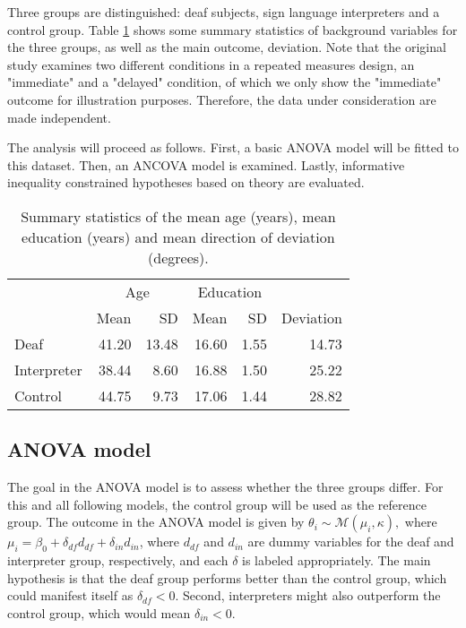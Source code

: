 \documentclass[11pt,a4paper]{article}\usepackage[]{graphicx}\usepackage[]{color}
\begin{document}
Three groups are distinguished: deaf subjects, sign language interpreters and a control group. Table \ref{ExampleDescrTable} shows some summary statistics of background variables for the three groups, as well as the main outcome, deviation. Note that the original study examines two different conditions in a repeated measures design, an "immediate" and a "delayed" condition, of which we only show the "immediate" outcome for illustration purposes. Therefore, the data under consideration are made independent.

The analysis will proceed as follows. First, a basic ANOVA model will be fitted to this dataset. Then, an ANCOVA model is examined. Lastly, informative inequality constrained hypotheses based on theory are evaluated.

\begin{table}[btp]
\centering
\caption{Summary statistics of the mean age (years), mean education (years) and mean direction of deviation (degrees).} 
\label{ExampleDescrTable}
\begin{tabular}{lrrrrr}
  \toprule & \multicolumn{2}{c}{Age} & \multicolumn{2}{c}{Education} &  \\  \cmidrule(lr){2-3} \cmidrule(lr){4-5}  & Mean & SD & Mean & SD & Deviation \\ 
  \midrule
Deaf & 41.20 & 13.48 & 16.60 & 1.55 & 14.73 \\ 
  Interpreter & 38.44 & 8.60 & 16.88 & 1.50 & 25.22 \\ 
  Control & 44.75 & 9.73 & 17.06 & 1.44 & 28.82 \\ 
   \bottomrule
\end{tabular}
\end{table}



\subsection{ANOVA model}



The goal in the ANOVA model is to assess whether the three groups differ. For this and all following models, the control group will be used as the reference group. The outcome in the ANOVA model is given by \( \theta_i \sim \mathcal{M}(\mu_i, \kappa), \) where \( \mu_i = \beta_0 + \delta_{df} d_{df} + \delta_{in} d_{in}\), where \( d_{df} \) and \( d_{in} \) are dummy variables for the deaf and interpreter group, respectively, and each \( \delta \) is labeled appropriately. The main hypothesis is that the deaf group performs better than the control group, which could manifest itself as \( \delta_{df} < 0.\) Second, interpreters might also outperform the control group, which would mean \( \delta_{in} < 0.\)
\end{document}
